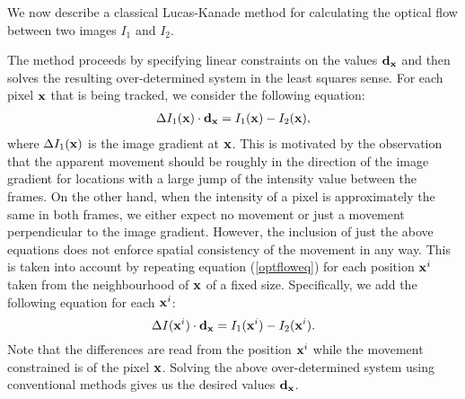 We now describe a classical Lucas-Kanade method \cite{lucas} for calculating the optical flow between two images $I_1$ and $I_2$.

The method proceeds by specifying linear constraints on the values $\mathbf{d}_{\mathbf{x}}$ and then solves the resulting over-determined system in the least squares sense. 
For each pixel $\mathbf{x}$ that is being tracked, we consider the following equation: 
\begin{align} 
\label{optfloweq} 
\Delta I_1(\mathbf{x}) \cdot \mathbf{d}_{\mathbf{x}} = I_1(\mathbf{x}) - I_2(\mathbf{x}),
\end{align} 
where $\Delta I_1(\mathbf{x})$ is the image gradient at $\mathbf{x}$.
This is motivated by the observation that the apparent movement should be roughly in the direction of the image gradient for locations with a large jump of the intensity value between the frames. 
On the other hand, when the intensity of a pixel is approximately the same in both frames, we either expect no movement or just a movement perpendicular to the image gradient.
However, the inclusion of just the above equations does not enforce spatial consistency of the movement in any way.
This is taken into account by repeating equation (\ref{optfloweq}) for each position $\mathbf{x}^i$ taken from the neighbourhood of $\mathbf{x}$ of a fixed size. 
Specifically, we add the following equation for each $\mathbf{x}^i$:
$$\Delta I(\mathbf{x}^i) \cdot \mathbf{d}_{\mathbf{x}} = I_1(\mathbf{x}^i) - I_2(\mathbf{x}^i).$$
Note that the differences are read from the position $\mathbf{x}^i$ while the movement constrained is of the pixel $\mathbf{x}$.
Solving the above over-determined system using conventional methods gives us the desired values $\mathbf{d}_{\mathbf{x}}$.

